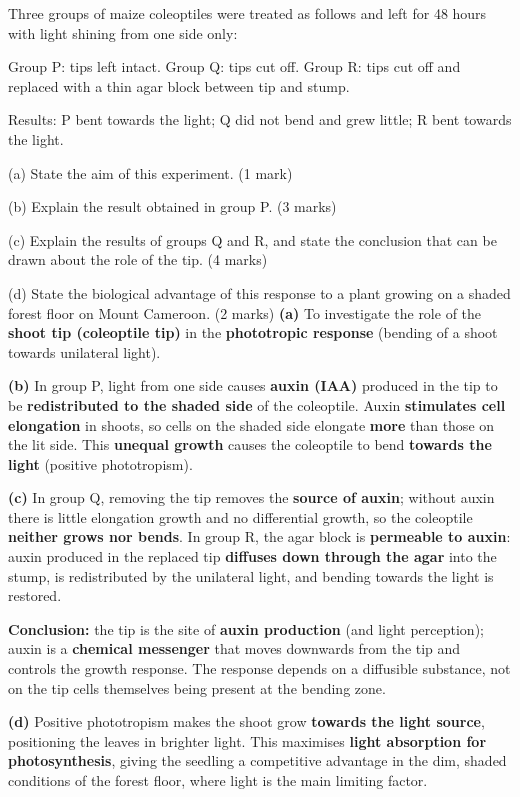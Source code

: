 \documentclass[11pt]{article}
\begin{document}
\begin{exoresolu}
Three groups of maize coleoptiles were treated as follows and left for 48 hours with light shining from one side only:\par
Group P: tips left intact. \quad Group Q: tips cut off. \quad Group R: tips cut off and replaced with a thin agar block between tip and stump.\par
Results: P bent towards the light; Q did not bend and grew little; R bent towards the light.\par
(a) State the aim of this experiment. \hfill (1 mark)\par
(b) Explain the result obtained in group P. \hfill (3 marks)\par
(c) Explain the results of groups Q and R, and state the conclusion that can be drawn about the role of the tip. \hfill (4 marks)\par
(d) State the biological advantage of this response to a plant growing on a shaded forest floor on Mount Cameroon. \hfill (2 marks)
\tcblower
\textbf{(a)} To investigate the role of the \textbf{shoot tip (coleoptile tip)} in the \textbf{phototropic response} (bending of a shoot towards unilateral light).\par
\textbf{(b)} In group P, light from one side causes \textbf{auxin (IAA)} produced in the tip to be \textbf{redistributed to the shaded side} of the coleoptile. Auxin \textbf{stimulates cell elongation} in shoots, so cells on the shaded side elongate \textbf{more} than those on the lit side. This \textbf{unequal growth} causes the coleoptile to bend \textbf{towards the light} (positive phototropism).\par
\textbf{(c)} In group Q, removing the tip removes the \textbf{source of auxin}; without auxin there is little elongation growth and no differential growth, so the coleoptile \textbf{neither grows nor bends}. In group R, the agar block is \textbf{permeable to auxin}: auxin produced in the replaced tip \textbf{diffuses down through the agar} into the stump, is redistributed by the unilateral light, and bending towards the light is restored.\par
\textbf{Conclusion:} the tip is the site of \textbf{auxin production} (and light perception); auxin is a \textbf{chemical messenger} that moves downwards from the tip and controls the growth response. The response depends on a diffusible substance, not on the tip cells themselves being present at the bending zone.\par
\textbf{(d)} Positive phototropism makes the shoot grow \textbf{towards the light source}, positioning the leaves in brighter light. This maximises \textbf{light absorption for photosynthesis}, giving the seedling a competitive advantage in the dim, shaded conditions of the forest floor, where light is the main limiting factor.
\end{exoresolu}
\end{document}

